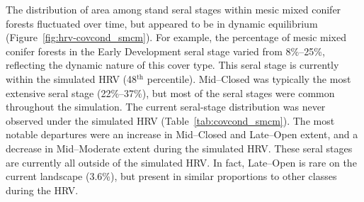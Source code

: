 The distribution of area among stand seral stages within mesic mixed conifer forests fluctuated over time, but appeared to be in dynamic equilibrium (Figure~\ref{fig:hrv-covcond_smcm}). For example, the percentage of mesic mixed conifer forests in the Early Development seral stage varied from 8\%--25\%, reflecting the dynamic nature of this cover type. This seral stage is currently within the simulated HRV (48$^{\text{th}}$ percentile). Mid--Closed was typically the most extensive seral stage (22\%--37\%), but most of the seral stages were common throughout the simulation. %
The current seral-stage distribution was never observed under the simulated HRV (Table~\ref{tab:covcond_smcm}). The most notable departures were an increase in Mid--Closed and Late--Open extent, and a decrease in Mid--Moderate extent during the simulated HRV. These seral stages are currently all outside of the simulated HRV. In fact, Late--Open is rare on the current landscape (3.6\%), but present in similar proportions to  other classes during the HRV. 


